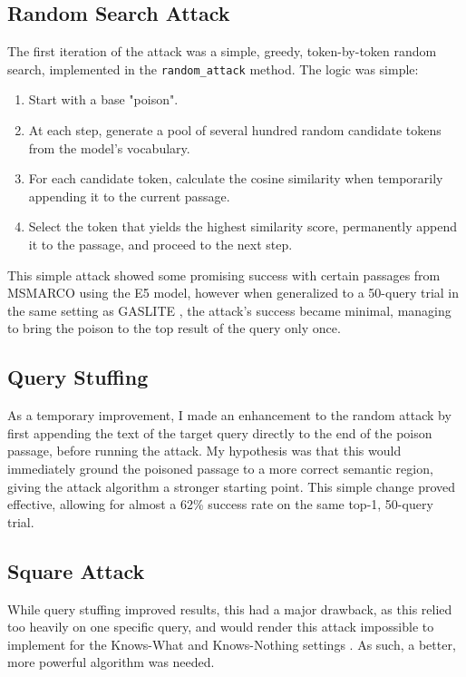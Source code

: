 \documentclass[a4paper, sigconf]{acmart}
\begin{document}
\subsection{Random Search Attack}

The first iteration of the attack was a simple, greedy, token-by-token random search, implemented in the \texttt{random\_attack} method. The logic was simple: 

\begin{enumerate}
  \item Start with a base "poison".
  \item At each step, generate a pool of several hundred random candidate tokens from the model's vocabulary. 
  \item For each candidate token, calculate the cosine similarity when temporarily appending it to the current passage.
  \item Select the token that yields the highest similarity score, permanently append it to the passage, and proceed to the next step.  
\end{enumerate}

This simple attack showed some promising success with certain passages from MSMARCO using the E5 model, however when generalized to a 50-query trial in the same setting as GASLITE \cite{bentov2024}, the attack's success became minimal, managing to bring the poison to the top result of the query only once.


\subsection{Query Stuffing}

As a temporary improvement, I made an enhancement to the random attack by first appending the text of the target query directly to the end of the poison passage, before running the attack. My hypothesis was that this would immediately ground the poisoned passage to a more correct semantic region, giving the attack algorithm a stronger starting point. This simple change proved effective, allowing for almost a 62\% success rate on the same top-1, 50-query trial. 


\subsection{Square Attack}

While query stuffing improved results, this had a major drawback, as this relied too heavily on one specific query, and would render this attack impossible to implement for the Knows-What and Knows-Nothing settings \cite{bentov2024}. As such, a better, more powerful algorithm was needed. 
\end{document}
